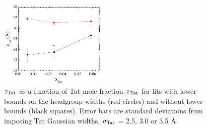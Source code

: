 \begin{figure}[htbp]
  \centering
  \includegraphics[width=0.45\textwidth]{figures/Tat/SDP_Results/zTat_bound}
  \caption[$\zTat$ as a function of Tat mole fraction $\xTat$ for fits with
  lower bounds on the headgroup widths (red circles) and without lower 
  bounds (black squares)]
  {$\zTat$ as a function of Tat mole fraction $\xTat$ for fits with
  lower bounds on the headgroup widths (red circles) and without lower 
  bounds (black squares). 
  Error bars are standard deviations from imposing Tat Gaussian widths, 
  $\sigma_\textrm{Tat}$ = 2.5, 3.0 or 3.5 \AA.}
  \label{fig:zTat_bound}
\end{figure}

